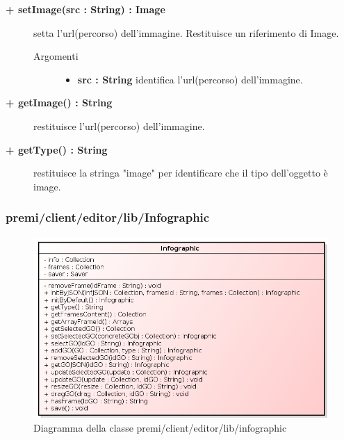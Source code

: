 \begin{description}
\begin{description}
		\item[\textbf{\color{blue}+ setImage(src : String) : Image			}] \hfill
			setta l'url(percorso) dell'immagine. Restituisce un riferimento di Image.
			
		\begin{description}
			\item[Argomenti] \hfill
				\begin{itemize}
				
					\item \textbf{src : String			} \hfill
					identifica l'url(percorso) dell'immagine.
				\end{itemize}
		\end{description}

\end{description}

\begin{description}
		\item[\textbf{\color{blue}+ getImage() : String			}] \hfill
			restituisce l'url(percorso) dell'immagine. 

\end{description}

\begin{description}
		\item[\textbf{\color{blue}+ getType() : String			}] \hfill
			restituisce la stringa "image" per identificare che il tipo dell'oggetto è image. 

\end{description}



\end{description}


\subsubsection{premi/client/editor/lib/Infographic}
\begin{figure}[h]
\begin{center}
\includegraphics[scale=0.40]{img/diacla/Infographic.png}
\caption{Diagramma della classe premi/client/editor/lib/infographic}
\end{center}
\end{figure}

